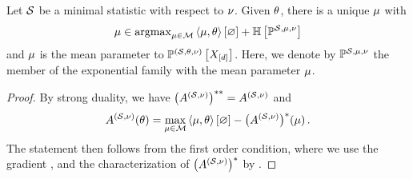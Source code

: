\begin{theorem}
    Let $\mathcal{S}$ be a minimal statistic with respect to $\nu$.
    Given $\theta$, there is a unique $\mu$ with
    \begin{align*}
        \meanparam \in \argmax_{\meanparam\in\meanset} \contraction{\meanparam,\canparam} + \sentropyof{\expdistof{\sstat,\meanparam,\basemeasure}} %
    \end{align*}
    and $\mu$ is the mean parameter to $\mathbb{P}^{(\mathcal{S},\theta,\nu)}\left[X_{[d]}\right]$.
    Here, we denote by $\mathbb{P}^{\mathcal{S},\mu,\nu}$ the member of the exponential family with the mean parameter $\mu$.
\end{theorem}
\begin{proof}
    By strong duality, we have $\left(A^{(\mathcal{S},\nu)}\right)^{**}=A^{(\mathcal{S},\nu)}$ and
    \begin{align*}
        A^{(\mathcal{S},\nu)}(\theta) = \max_{\mu\in\mathcal{M}} \left\langle \mu,\theta\right\rangle \left[ \varnothing \right] -  \big(A^{(\mathcal{S},\nu)}\big)^*(\mu) \, .
    \end{align*}
    The statement then follows from the first order condition, where we use the gradient , and the characterization of $\big(A^{(\mathcal{S},\nu)}\big)^*$ by . %
\end{proof}



